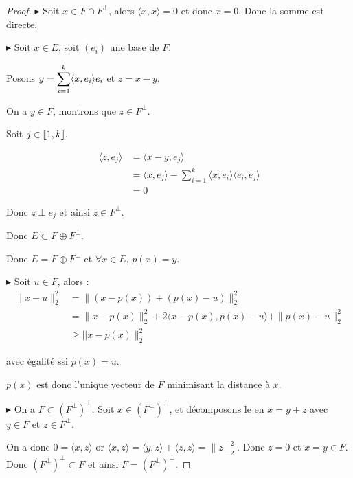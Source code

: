 \begin{proof}
    $\blacktriangleright$ Soit $x \in F \cap F^\perp$, alors $\langle x, x \rangle = 0$ et donc $x = 0$. 
    Donc la somme est directe. 

    \avspace $\blacktriangleright$ Soit $x \in E$, soit $(e_i)$ une base de $F$. 

    Posons $y = \displaystyle \sum_{i = 1}^k \langle x, e_i \rangle e_i$ et $z = x - y$. 

    On a $y \in F$, montrons que $z \in F^\perp$. 

    Soit $j \in [\![1, k]\!]$. 

    \begin{align}
        \langle z, e_j \rangle & = \langle x - y, e_j \rangle \\
        & = \langle x, e_j \rangle - \sum_{i = 1}^k \langle x, e_i \rangle \langle e_i, e_j \rangle \\
        & = 0
    \end{align}

    Donc $z \perp e_j$ et ainsi $z \in F^\perp$.

    Donc $E \subset F \oplus F^\perp$.

    Donc $E = F \oplus F^\perp$ et $\forall x \in E$, $p(x) = y$. 

    \avspace $\blacktriangleright$ Soit $u \in F$, alors :
    \begin{align}
        \| x - u \|_2^2 & = \| (x - p(x)) + (p(x) - u) \|_2^2 \\
        & = \| x - p(x) \|_2^2 + 2\langle x - p(x), p(x) - u \rangle + \| p(x) - u \|_2^2 \\
        & \geqslant || x - p(x) \|_2^2
    \end{align}

    avec égalité ssi $p(x) = u$. 

    $p(x)$ est donc l'unique vecteur de $F$ minimisant la distance à $x$.

    \avspace $\blacktriangleright$ On a $F \subset (F^\perp)^\perp$. Soit $x \in (F^\perp)^\perp$,
    et décomposons le en $x = y + z$ avec $y \in F$ et $z \in F^\perp$.

    On a donc $0 = \langle x, z \rangle$ or $\langle x, z \rangle = \langle y, z \rangle + \langle z, z \rangle = \|z\|_2^2$.
    Donc $z = 0$ et $x = y \in F$. Donc $(F^\perp)^\perp \subset F$ et ainsi $F = (F^\perp)^\perp$.
\end{proof}

